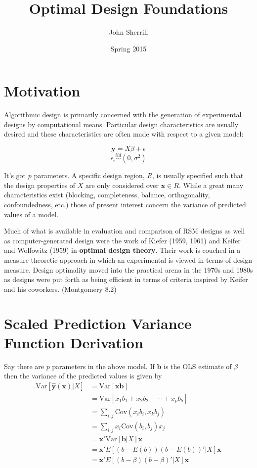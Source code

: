 \documentclass{article}\usepackage[]{graphicx}\usepackage[]{color}
\title{\vspace{-70pt} Optimal Design Foundations \vspace{-10pt}}
\author{John Sherrill\vspace{-20pt}}
\date{Spring 2015 \vspace{-10pt}}
\newcommand{\Var}{\mathrm{Var}}
\newcommand{\Cov}{\mathrm{Cov}}
\begin{document}
\maketitle

\section{Motivation}

Algorithmic design is primarily concerned with the generation of experimental designs by computational means. Particular design characteristics are usually desired and these characteristics are often made with respect to a given model:

$$ \textbf{y} = X\beta + \epsilon $$
$$ \epsilon_i \stackrel{iid}{\sim} (0, \sigma^2) $$

It's got $p$ parameters. A specific design region, $R$, is usually specified such that the design properties of $X$ are only considered over $\textbf{x} \in R$. While a great many characteristics exist (blocking, completeness, balance, orthogonality, confoundedness, etc.) those of present interest concern the variance of predicted values of a model.

Much of what is available in evaluation and comparison of RSM designs as well as computer-generated design were the work of Kiefer (1959, 1961) and Keifer and Wolfowitz (1959) in \textbf{optimal design theory}. Their work is couched in a measure theoretic approach in which an experimental is viewed in terms of design measure. Design optimality moved into the practical arena in the 1970s and 1980s as designs were put forth as being efficient in terms of criteria inspired by Keifer and his coworkers. (Montgomery 8.2)

\section{Scaled Prediction Variance Function Derivation}

Say there are $p$ parameters in the above model. If $\textbf{b}$ is the OLS estimate of $\beta$ then the variance of the predicted values is given by
\begin{align*}
  \Var[\hat{\textbf{y}}(\textbf{x}) | X] &= \Var[\textbf{xb}] \\
  &= \Var[x_1 b_1 + x_2 b_2 + \cdots + x_p b_b] \\
  &= \sum_{i,j} \Cov(x_i b_i, x_k b_j) \\
  &= \sum_{i,j} x_i \Cov(b_i, b_j) x_j \\
  &= \textbf{x}' \Var[\textbf{b} | X] \textbf{x} \\
  &= \textbf{x}' E[(b-E(b)) (b-E(b))' | X] \textbf{x} \\
  &= \textbf{x}' E[(b-\beta)(b-\beta)' | X] \textbf{x} \\
\end{align*}
\end{document}
